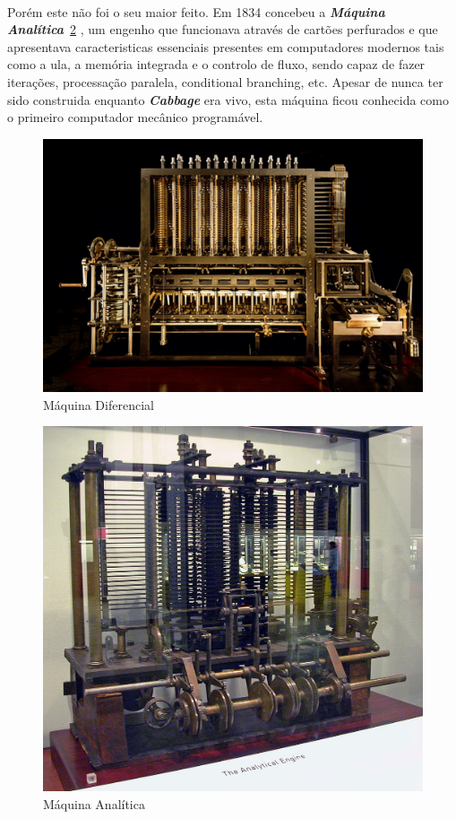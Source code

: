 \documentclass{report}
\begin{document}
\paragraph{}
Porém este não foi o seu maior feito. Em 1834 concebeu a \textbf{\textit{Máquina Analítica}}~\ref{analitica} \cite{Cabbage}, um engenho que funcionava através de cartões perfurados e que apresentava caracteristicas essenciais presentes em computadores modernos tais como a \acs{ula}, a memória integrada e o controlo de fluxo, sendo capaz de fazer iterações, processação paralela, conditional branching, etc.
Apesar de nunca ter sido construida enquanto \textbf{\textit{Cabbage}} era vivo, esta máquina ficou conhecida como o primeiro computador mecânico programável.

\begin{figure}
\centering
\includegraphics[width=0.7\linewidth]{Diferencial.png}
\caption{Máquina Diferencial}
\label{diferencial}
\end{figure}

\begin{figure}
\centering
\includegraphics[width=0.7\linewidth]{Analitico.jpg}
\caption{Máquina Analítica}
\label{analitica}
\end{figure}
\end{document}

